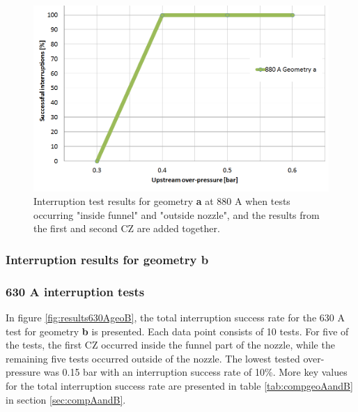 \documentclass[10pt,b5paper,twoside]{article}
\begin{document}
\begin{figure}[H]
\centering
\includegraphics[scale=0.45]{Bilder/Results/geoA880Anew.PNG}
\caption{Interruption test results for geometry \textbf{a} at 880 A when tests occurring "inside funnel" and "outside nozzle", and the results from the first and second CZ are added together.} \label{fig:results880AgeoA}
\end{figure}

\subsubsection{Interruption results for geometry \textbf{b}} \label{sec:intTestGeoB}

\subsubsection*{630 A interruption tests}

In figure \ref{fig:results630AgeoB}, the total interruption success rate for the 630 A test for geometry \textbf{b} is presented. Each data point consists of 10 tests. For five of the tests, the first CZ occurred inside the funnel part of the nozzle, while the remaining five tests occurred outside of the nozzle. The lowest tested over-pressure was 0.15 bar with an interruption success rate of 10\%. More key values for the total interruption success rate are presented in table \ref{tab:compgeoAandB} in section \ref{sec:compAandB}.
\end{document}
